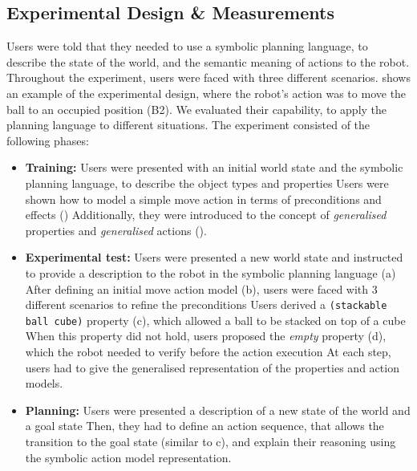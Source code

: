\subsection{Experimental Design \& Measurements}
Users were told that they needed to use a symbolic planning language, to describe the state of the world, and the semantic meaning of actions to the robot. 
Throughout the experiment, users were faced with three different scenarios. 
 shows an example of the experimental design, where the robot's action was to move the ball to an occupied position (B2). 
We evaluated their capability, to apply the planning language to different situations.
The experiment consisted of the following phases:

\begin{itemize}
  \item{\textbf{Training:} Users were presented with an initial world state and the symbolic planning language, to describe the object types and properties
Users were shown how to model a simple move action in terms of preconditions and effects ()
Additionally, they were introduced to the concept of \textit{generalised} properties and \textit{generalised} actions ().}
  \item{\textbf{Experimental test:} Users were presented a new world state and instructed to provide a description to the robot in the symbolic planning language (a)
After defining an initial move action model (b), users were faced with 3 different scenarios to refine the preconditions
Users derived a \texttt{(stackable ball cube)} property (c), which allowed a ball to be stacked on top of a cube
When this property did not hold, users proposed the \textit{empty} property (d), which the robot needed to verify before the action execution
At each step, users had to give the generalised representation of the properties and action models.}
  \item{\textbf{Planning:} Users were presented a description of a new state of the world and a goal state
Then, they had to define an action sequence, that allows the transition to the goal state (similar to c), and explain their reasoning using the symbolic action model representation.}

\end{itemize}
